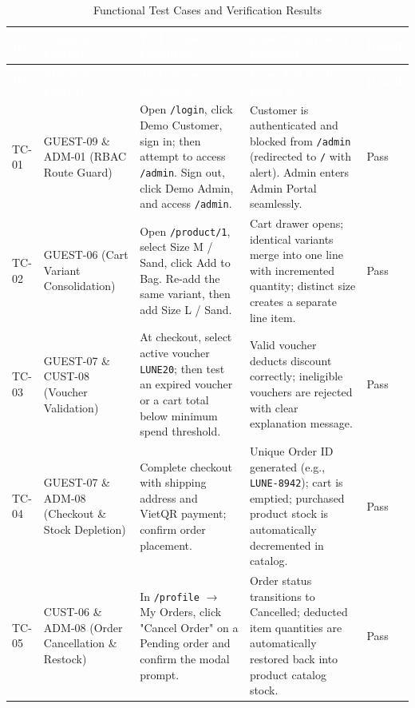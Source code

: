 \documentclass[12pt,a4paper,oneside]{report}
\begin{document}
\begin{longtable}{|p{1.3cm}|p{3.1cm}|p{4.6cm}|p{4.7cm}|p{1.1cm}|}
\caption{Functional Test Cases and Verification Results} \\
\hline
\rowcolor{PrimaryBrown}
\textcolor{white}{\textbf{ID}} & \textcolor{white}{\textbf{Mapped Feature}} & \textcolor{white}{\textbf{Test Steps Executed}} & \textcolor{white}{\textbf{Expected System Behavior}} & \textcolor{white}{\textbf{Result}} \\
\hline
\endfirsthead
\hline
\rowcolor{PrimaryBrown}
\textcolor{white}{\textbf{ID}} & \textcolor{white}{\textbf{Mapped Feature}} & \textcolor{white}{\textbf{Test Steps Executed}} & \textcolor{white}{\textbf{Expected System Behavior}} & \textcolor{white}{\textbf{Result}} \\
\hline
\endhead
\hline
\endfoot
TC-01 & GUEST-09 \& ADM-01 (RBAC Route Guard) & Open \texttt{/login}, click Demo Customer, sign in; then attempt to access \texttt{/admin}. Sign out, click Demo Admin, and access \texttt{/admin}. & Customer is authenticated and blocked from \texttt{/admin} (redirected to \texttt{/} with alert). Admin enters Admin Portal seamlessly. & Pass \\
\hline
TC-02 & GUEST-06 (Cart Variant Consolidation) & Open \texttt{/product/1}, select Size M / Sand, click Add to Bag. Re-add the same variant, then add Size L / Sand. & Cart drawer opens; identical variants merge into one line with incremented quantity; distinct size creates a separate line item. & Pass \\
\hline
TC-03 & GUEST-07 \& CUST-08 (Voucher Validation) & At checkout, select active voucher \texttt{LUNE20}; then test an expired voucher or a cart total below minimum spend threshold. & Valid voucher deducts discount correctly; ineligible vouchers are rejected with clear explanation message. & Pass \\
\hline
TC-04 & GUEST-07 \& ADM-08 (Checkout \& Stock Depletion) & Complete checkout with shipping address and VietQR payment; confirm order placement. & Unique Order ID generated (e.g., \texttt{LUNE-8942}); cart is emptied; purchased product stock is automatically decremented in catalog. & Pass \\
\hline
TC-05 & CUST-06 \& ADM-08 (Order Cancellation \& Restock) & In \texttt{/profile} $\rightarrow$ My Orders, click "Cancel Order" on a Pending order and confirm the modal prompt. & Order status transitions to Cancelled; deducted item quantities are automatically restored back into product catalog stock. & Pass \\

\end{longtable}
\end{document}
